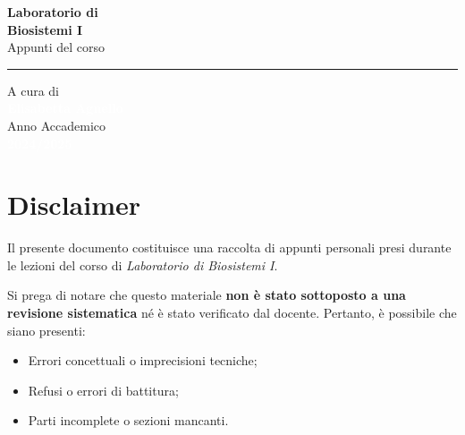 \documentclass[a4paper,10pt]{book}
\begin{document}
\begin{titlepage}
\begin{flushleft}
        \vspace{4.5cm}
        
        \textcolor{colorE}{\sffamily\fontsize{60}{70}\selectfont\textbf{Laboratorio di}}\\[0.1cm]
        \textcolor{colorE}{\sffamily\fontsize{60}{70}\selectfont\textbf{Biosistemi I}}\\[0.6cm]
        \textcolor{white!80}{\sffamily\Large Appunti del corso}\\[0.5cm]
        \textcolor{white!30}{\rule{6cm}{1pt}} %
    \end{flushleft}
    
    \vfill %
    
    \begin{flushleft}
        \textcolor{white!60}{\sffamily\large A cura di}\\[0.2cm]
        \textcolor{white}{\sffamily\huge\textbf{Elisabetta Agnello}}\\[1.2cm]
        
        \textcolor{white!60}{\sffamily\large Anno Accademico}\\[0.2cm]
        \textcolor{white}{\sffamily\Large\textbf{2024/2025}}
    \end{flushleft}
    
    \vspace*{1cm} %
\end{titlepage}
    
\chapter*{Disclaimer}
\thispagestyle{empty} %

Il presente documento costituisce una raccolta di appunti personali presi durante le lezioni del corso di \textit{Laboratorio di Biosistemi I}. 

Si prega di notare che questo materiale \textbf{non è stato sottoposto a una revisione sistematica} né è stato verificato dal docente. Pertanto, è possibile che siano presenti:
\begin{itemize}
    \item Errori concettuali o imprecisioni tecniche;
    \item Refusi o errori di battitura;
    \item Parti incomplete o sezioni mancanti.
\end{itemize}
\end{document}
